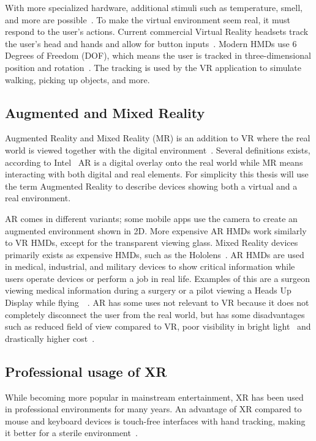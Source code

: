 \documentclass[a4paper]{report}
\begin{document}
With more specialized hardware, additional stimuli such as temperature, smell, and more are possible~\cite{noauthor_feelreal_nodate}.
To make the virtual environment seem real, it must respond to the user's actions. Current commercial Virtual Reality headsets track the user's head and hands and allow for button inputs~\cite{noauthor_oculus_nodate}. Modern HMDs use 6 Degrees of Freedom (DOF), which means the user is tracked in three-dimensional position and rotation~\cite{lang_introduction_2013}. The tracking is used by the VR application to simulate walking, picking up objects, and more.

\subsection{Augmented and Mixed Reality}
Augmented Reality and Mixed Reality (MR) is an addition to VR where the real world is viewed together with the digital environment~\cite{hackett_three-dimensional_2016}. Several definitions exists, according to Intel~\cite{intel_virtual_nodate} AR is a digital overlay onto the real world while MR means interacting with both digital and real elements.
For simplicity this thesis will use the term Augmented Reality to describe devices showing both a virtual and a real environment.

AR comes in different variants; some mobile apps use the camera to create an augmented environment shown in 2D. More expensive AR HMDs work similarly to VR HMDs, except for the transparent viewing glass. Mixed Reality devices primarily exists as expensive HMDs, such as the Hololens~\cite{hololens_microsoft_nodate}.
AR HMDs are used in medical, industrial, and military devices to show critical information while users operate devices or perform a job in real life. Examples of this are a surgeon viewing medical information during a surgery or a pilot viewing a Heads Up Display while flying~\cite{mihelj_virtual_2014}~\cite{mertz_virtual_2019}.
AR has some uses not relevant to VR because it does not completely disconnect the user from the real world, but has some disadvantages such as reduced field of view compared to VR, poor visibility in bright light~\cite{hackett_three-dimensional_2016} and drastically higher cost~\cite{medical_holodeck_medicalholodeck_nodate}.

\subsection{Professional usage of XR}
While becoming more popular in mainstream entertainment, XR has been used in professional environments for many years.
An advantage of XR compared to mouse and keyboard devices is touch-free interfaces with hand tracking, making it better for a sterile environment~\cite{andrews_extended_2019}.
\end{document}
